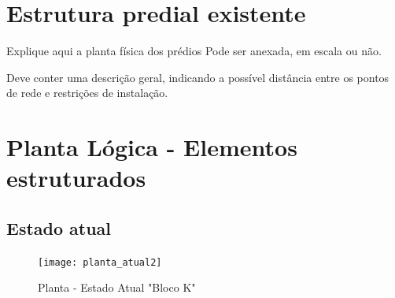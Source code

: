 \documentclass[	DIV=calc,%
							paper=a4,%
							fontsize=12pt,%
							onecolumn]{scrartcl}	 					%
\begin{document}
\section{Estrutura predial existente}

Explique aqui a planta física dos prédios
Pode ser anexada, em escala ou não.

Deve conter uma descrição geral, indicando a possível distância entre os pontos de rede e restrições de instalação.

\section{Planta Lógica - Elementos estruturados}

\subsection{Estado atual}
\begin{figure}
	\centering
	\caption{Planta - Estado Atual "Bloco K"}
	\texttt{[image: planta\_atual2]}
\end{figure}
\end{document}
